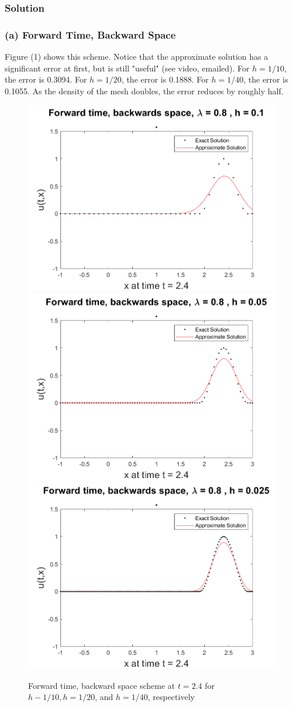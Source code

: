 \documentclass[12pt]{article}
\begin{document}
\subsubsection*{Solution}

\subsubsection*{(a) Forward Time, Backward Space}

Figure (1) shows this scheme. Notice that the approximate solution has a significant error at first, but is still "useful" (see video, emailed). For $h=1/10$, the error is 0.3094. For $h=1/20$, the error is 0.1888. For $h=1/40$, the error is 0.1055. As the density of the mesh doubles, the error reduces by roughly half.

\begin{figure}
	\centering
	\includegraphics[width=.6\linewidth]{./code/a_forward_time_backward_space_1_10th.png}	\includegraphics[width=.6\linewidth]{./code/a_forward_time_backward_space_1_20th.png}
	\includegraphics[width=.6\linewidth]{./code/a_forward_time_backward_space_1_40th.png}
	\caption{Forward time, backward space scheme at $t=2.4$ for $h-1/10, h=1/20$, and $h=1/40$, respectively}
\end{figure}
\end{document}

